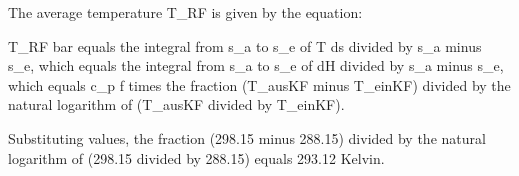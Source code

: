 The average temperature T_RF is given by the equation:

T_RF bar equals the integral from s_a to s_e of T ds divided by s_a minus s_e, which equals the integral from s_a to s_e of dH divided by s_a minus s_e, which equals c_p f times the fraction (T_ausKF minus T_einKF) divided by the natural logarithm of (T_ausKF divided by T_einKF).

Substituting values, the fraction (298.15 minus 288.15) divided by the natural logarithm of (298.15 divided by 288.15) equals 293.12 Kelvin.